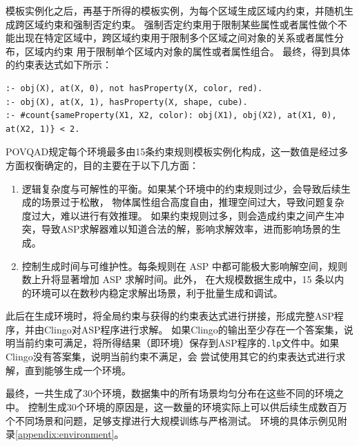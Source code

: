 模板实例化之后，再基于所得的模板实例，为每个区域生成区域内约束，并随机生成跨区域约束和强制否定约束。
强制否定约束用于限制某些属性或者属性做个不能出现在特定区域中，跨区域约束用于限制多个区域之间对象的关系或者属性分布，区域内约束
用于限制单个区域内对象的属性或者属性组合。
最终，得到具体的约束表达式如下所示：
\begin{lstlisting}
:- obj(X), at(X, 0), not hasProperty(X, color, red).
:- obj(X), at(X, 1), hasProperty(X, shape, cube).
:- #count{sameProperty(X1, X2, color): obj(X1), obj(X2), at(X1, 0), at(X2, 1)} < 2.
\end{lstlisting}

POVQAD规定每个环境最多由15条约束规则模板实例化构成，这一数值是经过多方面权衡确定的，目的主要在于以下几方面：
\begin{enumerate}[nosep]
\item 逻辑复杂度与可解性的平衡。如果某个环境中的约束规则过少，会导致后续生成的场景过于松散，
物体属性组合高度自由，推理空间过大，导致问题复杂度过大，难以进行有效推理。
如果约束规则过多，则会造成约束之间产生冲突，导致ASP求解器难以知道合法的解，影响求解效率，进而影响场景的生成。
\item 控制生成时间与可维护性。每条规则在 ASP 中都可能极大影响解空间，规则数上升将显著增加 ASP 求解时间。此外，
在大规模数据生成中，15 条以内的环境可以在数秒内稳定求解出场景，利于批量生成和调试。
\end{enumerate}

此后在生成环境时，将全局约束与获得的约束表达式进行拼接，形成完整ASP程序，并由Clingo对ASP程序进行求解。
如果Clingo的输出至少存在一个答案集，说明当前约束可满足，将所得结果（即环境）保存到ASP程序的\texttt{.lp}文件中。如果Clingo没有答案集，说明当前约束不满足，会
尝试使用其它的约束表达式进行求解，直到能够生成一个环境。

最终，一共生成了30个环境，数据集中的所有场景均匀分布在这些不同的环境之中。
控制生成30个环境的原因是，这一数量的环境实际上可以供后续生成数百万个不同场景和问题，足够支撑进行大规模训练与严格测试。
环境的具体示例见附录\ref{appendix:environment}。
